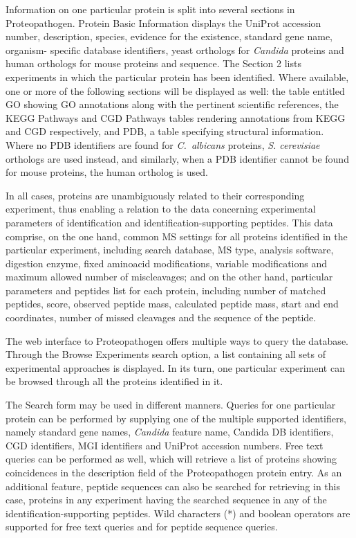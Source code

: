 Information on one particular protein is split into several
sections in Proteopathogen. Protein Basic Information
displays the UniProt accession number, description, species,
evidence for the existence, standard gene name, organism-
specific database identifiers, yeast orthologs for \textit{Candida}
proteins and human orthologs for mouse proteins and
sequence. The Section 2 lists experiments in which the
particular protein has been identified. Where available,
one or more of the following sections will be displayed
as well: the table entitled GO showing GO annotations
along with the pertinent scientific references, the KEGG
Pathways and CGD Pathways tables rendering annotations
from KEGG and CGD respectively, and PDB, a table
specifying structural information. Where no PDB identifiers
are found for \textit{\mbox{C. albicans}} proteins, \textit{S. cerevisiae} orthologs
are used instead, and similarly, when a PDB identifier
cannot be found for mouse proteins, the human ortholog
is used.

In all cases, proteins are unambiguously related to their
corresponding experiment, thus enabling a relation to the
data concerning experimental parameters of identification
and identification-supporting peptides. This data comprise,
on the one hand, common MS settings for all proteins
identified in the particular experiment, including search
database, MS type, analysis software, digestion enzyme,
fixed aminoacid modifications, variable modifications and
maximum allowed number of miscleavages; and on the
other hand, particular parameters and peptides list for each
protein, including number of matched peptides, score,
observed peptide mass, calculated peptide mass, start and
end coordinates, number of missed cleavages and the
sequence of the peptide.

The web interface to Proteopathogen offers multiple
ways to query the database. Through the Browse Experiments
search option, a list containing all sets of experimental
approaches is displayed. In its turn, one particular
experiment can be browsed through all the proteins
identified in it.

The Search form may be used in different manners.
Queries for one particular protein can be performed by
supplying one of the multiple supported identifiers, namely
standard gene names, \textit{Candida} feature name, Candida DB
identifiers, CGD identifiers, MGI identifiers and UniProt
accession numbers. Free text queries can be performed as
well, which will retrieve a list of proteins showing coincidences
 in the description field of the Proteopathogen
protein entry. As an additional feature, peptide sequences
can also be searched for retrieving in this case, proteins in
any experiment having the searched sequence in any of the
identification-supporting peptides. Wild characters (*)
and boolean operators are supported for free text queries
and for peptide sequence queries.

